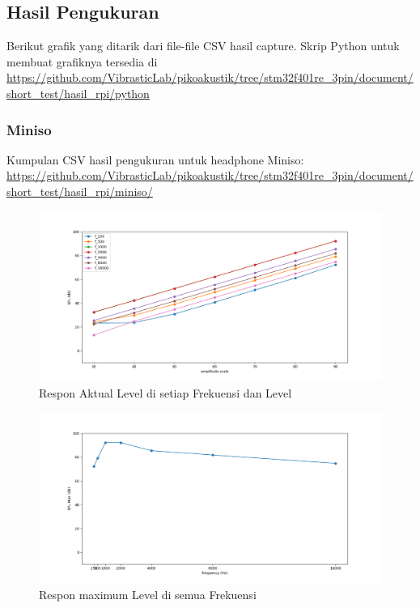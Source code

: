 \documentclass[12pt,]{article}
\begin{document}
	\newpage
	\subsection{Hasil Pengukuran}
	
	Berikut grafik yang ditarik dari file-file CSV hasil capture.
	Skrip Python untuk membuat grafiknya tersedia di \url{https://github.com/VibrasticLab/pikoakustik/tree/stm32f401re_3pin/document/short_test/hasil_rpi/python}
	
	\subsubsection{Miniso}
	
	Kumpulan CSV hasil pengukuran untuk headphone Miniso: \url{https://github.com/VibrasticLab/pikoakustik/tree/stm32f401re_3pin/document/short_test/hasil_rpi/miniso/}
	
	\begin{figure}[!ht]
		\centering
		\includegraphics[width=450pt]{images/graph/miniso_each}
		\caption{Respon Aktual Level di setiap Frekuensi dan Level}
	\end{figure}

	\begin{figure}[!ht]
		\centering
		\includegraphics[width=450pt]{images/graph/miniso_allmax}
		\caption{Respon maximum Level di semua Frekuensi}
	\end{figure}
\end{document}
